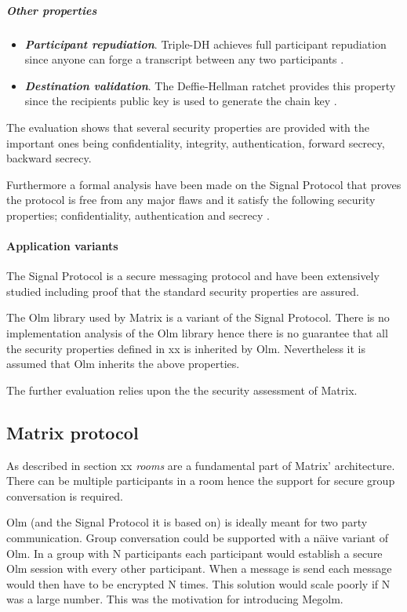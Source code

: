 \subparagraph{Other properties}

\begin{itemize}
	\item \textbf{\emph{Participant repudiation}}. Triple-DH achieves full participant repudiation since anyone can forge a transcript between any two participants \cite{sok}.
	\item \textbf{\emph{Destination validation}}. The Deffie-Hellman ratchet provides this property since the recipients public key is used to generate the chain key \cite{sok}. %
\end{itemize}


The evaluation shows that several security properties are provided with the important ones being confidentiality, integrity, authentication, forward secrecy, backward secrecy. 

Furthermore a formal analysis have been made on the Signal Protocol that proves the protocol is free from any major flaws and it satisfy the following security properties; confidentiality, authentication and secrecy \cite{Signal}. 

\paragraph{Application variants}

The Signal Protocol is a secure messaging protocol and have been extensively studied including proof that the standard security properties are assured. 

The Olm library used by Matrix is a variant of the Signal Protocol. There is no implementation analysis of the Olm library hence there is no guarantee that all the security properties defined in xx is inherited by Olm. Nevertheless it is assumed that Olm inherits the above properties.

The further evaluation relies upon the the security assessment of Matrix. 


\subsection{Matrix protocol}\label{matrixeval}

As described in section xx \emph{rooms} are a fundamental part of Matrix' architecture. There can be multiple participants in a room hence the support for secure group conversation is required. 

Olm (and the Signal Protocol it is based on) is ideally meant for two party communication.
Group conversation could be supported with a näive variant of Olm. In a group with N participants each participant would establish a secure Olm session with every other participant. When a message is send each message would then have to be encrypted N times. This solution would scale poorly if N was a large number. This was the motivation for introducing Megolm.

